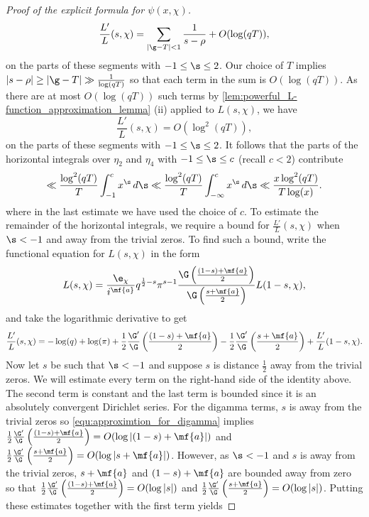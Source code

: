 \begin{proof}[Proof of the explicit formula for $\psi(x,\chi)$]
      \[
        \frac{L'}{L}(s,\chi) = \sum_{|\g-T| < 1}\frac{1}{s-\rho}+O(\log(qT)),
      \]
      on the parts of these segments with $-1 \le \s \le 2$. Our choice of $T$ implies $|s-\rho| \ge |\g-T| \gg \frac{1}{\log(qT)}$ so that each term in the sum is $O(\log(qT))$. As there are at most $O(\log(qT))$ such terms by \cref{lem:powerful_L-function_approximation_lemma} (ii) applied to $L(s,\chi)$, we have
      \[
        \frac{L'}{L}(s,\chi) = O(\log^{2}(qT)),
      \]
      on the parts of these segments with $-1 \le \s \le 2$. It follows that the parts of the horizontal integrals over $\eta_{2}$ and $\eta_{4}$ with  $-1 \le \s \le c$ (recall $c < 2$) contribute
      \begin{equation}\label{equ:explicit_formula_Dirichlet_proof_8}
        \ll \frac{\log^{2}(qT)}{T}\int_{-1}^{c}x^{\s}\,d\s \ll \frac{\log^{2}(qT)}{T}\int_{-\infty}^{c}x^{\s}\,d\s \ll \frac{x\log^{2}(qT)}{T\log(x)}.
      \end{equation}
      where in the last estimate we have used the choice of $c$. To estimate the remainder of the horizontal integrals, we require a bound for $\frac{L'}{L}(s,\chi)$ when $\s < -1$ and away from the trivial zeros. To find such a bound, write the functional equation for $L(s,\chi)$ in the form
      \[
        L(s,\chi) = \frac{\e_{\chi}}{i^{\mf{a}}}q^{\frac{1}{2}-s}\pi^{s-1}\frac{\G\left(\frac{(1-s)+\mf{a}}{2}\right)}{\G\left(\frac{s+\mf{a}}{2}\right)}L(1-s,\chi),
      \]
      and take the logarithmic derivative to get
      \[
        \frac{L'}{L}(s,\chi) = -\log(q)+\log(\pi)+\frac{1}{2}\frac{\G'}{\G}\left(\frac{(1-s)+\mf{a}}{2}\right)-\frac{1}{2}\frac{\G'}{\G}\left(\frac{s+\mf{a}}{2}\right)+\frac{L'}{L}(1-s,\chi).
      \]
      Now let $s$ be such that $\s < -1$ and suppose $s$ is distance $\frac{1}{2}$ away from the trivial zeros. We will estimate every term on the right-hand side of the identity above. The second term is constant and the last term is bounded since it is an absolutely convergent Dirichlet series. For the digamma terms, $s$ is away from the trivial zeros so \cref{equ:approximtion_for_digamma} implies $\frac{1}{2}\frac{\G'}{\G}\left(\frac{(1-s)+\mf{a}}{2}\right) = O(\log{|(1-s)+\mf{a}|})$ and $\frac{1}{2}\frac{\G'}{\G}\left(\frac{s+\mf{a}}{2}\right) = O(\log{|s+\mf{a}|})$. However, as $\s < -1$ and $s$ is away from the trivial zeros, $s+\mf{a}$ and $(1-s)+\mf{a}$ are bounded away from zero so that $\frac{1}{2}\frac{\G'}{\G}\left(\frac{(1-s)+\mf{a}}{2}\right) = O(\log{|s|})$ and $\frac{1}{2}\frac{\G'}{\G}\left(\frac{s+\mf{a}}{2}\right) = O(\log{|s|})$. Putting these estimates together with the first term yields

\end{proof}
